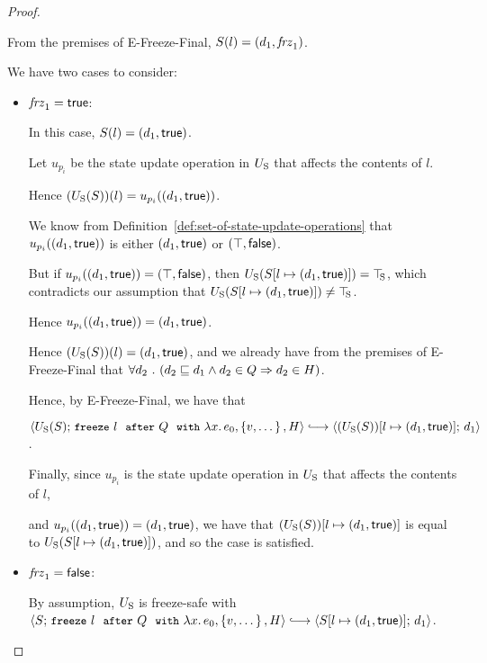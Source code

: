 \begin{proof}
\begin{itemize}
    From the premises of {\sc E-Freeze-Final}, $S(l) =
    (d_1, \mathit{frz}_1)$.

    We have two cases to consider:
    \begin{itemize}
    \item $\mathit{frz}_1 = \textsf{true}$:

      In this case, $S(l) = (d_1, \textsf{true})$.

      Let $u_{p_i}$ be the state update operation in $U_{\mathrm{S}}$ that
      affects the contents of $l$.

      Hence $(U_{\mathrm{S}}(S))(l) = u_{p_i}((d_1, \textsf{true}))$.

      We know from Definition~\ref{def:set-of-state-update-operations}
      that $u_{p_i}((d_1, \textsf{true}))$ is either
      $(d_1, \textsf{true})$ or $(\top, \textsf{false})$.

      But if $u_{p_i}((d_1, \textsf{true})) =
      (\top, \textsf{false})$, then
      $U_{\mathrm{S}}(S[l \mapsto (d_1, \textsf{true})]) = \top\hspace{-0.85mm}_{\mathrm{S}}$, which contradicts
      our assumption that $U_{\mathrm{S}}(S[l \mapsto (d_1, \textsf{true})]) \neq
      \top\hspace{-0.85mm}_{\mathrm{S}}$.

      Hence $u_{p_i}((d_1, \textsf{true})) =
      (d_1, \textsf{true})$.

      Hence $(U_{\mathrm{S}}(S))(l) = (d_1, \textsf{true})$, and we already
      have from the premises of {\sc E-Freeze-Final} that
      $\forall{d_2} ~.~ ( {d_2 \sqsubseteq d_1 \land d_2 \in Q}
      \Rightarrow d_2 \in H)$.

      Hence, by {\sc E-Freeze-Final}, we have that

      $\config{\Ustore(S)}{\freezeafterfull{l}{Q}{\lam{x}{e_0}}{\setof{v,
            \dots}}{H}} \parstepsto
      \config{\extS{(\Ustore(S))}{l}{d_1}{\frozentrue}}{d_1}$.

      Finally, since $u_{p_i}$ is the state update operation in $U_{\mathrm{S}}$
      that affects the contents of $l$,

      and $u_{p_i}((d_1, \textsf{true})) =
      (d_1, \textsf{true})$, we have that
      $(U_{\mathrm{S}}(S))[l \mapsto (d_1, \textsf{true})]$ is equal to
      $U_{\mathrm{S}}(S[l \mapsto (d_1, \textsf{true})])$, and so the case is
      satisfied.

    \item $\mathit{frz}_1 = \textsf{false}$:

      By assumption, $U_{\mathrm{S}}$ is freeze-safe with
      $\config{S}{\freezeafterfull{l}{Q}{\lam{x}{e_0}}{\setof{v,
            \dots}}{H}} \parstepsto
      \config{\extS{S}{l}{d_1}{\frozentrue}}{d_1}$.


\end{itemize}
\end{itemize}
\end{proof}
